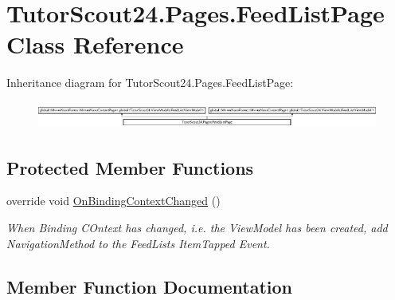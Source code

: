 \hypertarget{class_tutor_scout24_1_1_pages_1_1_feed_list_page}{}\section{Tutor\+Scout24.\+Pages.\+Feed\+List\+Page Class Reference}
\label{class_tutor_scout24_1_1_pages_1_1_feed_list_page}
Inheritance diagram for Tutor\+Scout24.\+Pages.\+Feed\+List\+Page\+:\begin{figure}[H]
\begin{center}
\leavevmode
\includegraphics[height=0.891720cm]{class_tutor_scout24_1_1_pages_1_1_feed_list_page}
\end{center}
\end{figure}
\subsection*{Protected Member Functions}
\begin{DoxyCompactItemize}
\item 
override void \mbox{\hyperlink{class_tutor_scout24_1_1_pages_1_1_feed_list_page_a8db8a53131b69ea69200fdc00bf7020b}{On\+Binding\+Context\+Changed}} ()
\begin{DoxyCompactList}\small\item\em When Binding C\+Ontext has changed, i.\+e. the View\+Model has been created, add Navigation\+Method to the Feed\+List\textquotesingle{}s Item\+Tapped Event. \end{DoxyCompactList}\end{DoxyCompactItemize}


\subsection{Member Function Documentation}
\mbox{\label{class_tutor_scout24_1_1_pages_1_1_feed_list_page_a8db8a53131b69ea69200fdc00bf7020b}} 
